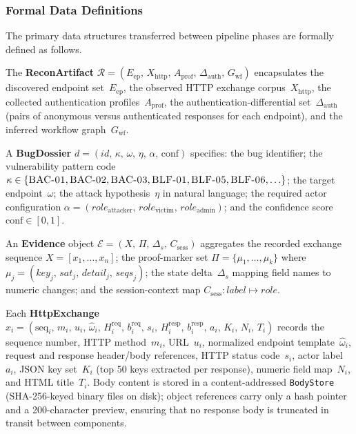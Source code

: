 \subsubsection{Formal Data Definitions}

The primary data structures transferred between pipeline phases are
formally defined as follows.

The \textbf{ReconArtifact}
$\mathcal{R} = (E_{\mathrm{ep}},\, X_{\mathrm{http}},\, A_{\mathrm{prof}},\,
\Delta_{\mathrm{auth}},\, G_{\mathrm{wf}})$
encapsulates the discovered endpoint set~$E_{\mathrm{ep}}$, the observed
HTTP exchange corpus~$X_{\mathrm{http}}$, the collected authentication
profiles~$A_{\mathrm{prof}}$, the authentication-differential
set~$\Delta_{\mathrm{auth}}$ (pairs of anonymous versus authenticated
responses for each endpoint), and the inferred workflow
graph~$G_{\mathrm{wf}}$.

A \textbf{BugDossier}
$d = (\mathit{id},\, \kappa,\, \omega,\, \eta,\, \alpha,\, \mathrm{conf})$
specifies: the bug identifier; the vulnerability pattern code
$\kappa \in \{\textsc{BAC-01}, \textsc{BAC-02}, \textsc{BAC-03},
\textsc{BLF-01}, \textsc{BLF-05}, \textsc{BLF-06}, \ldots\}$;
the target endpoint~$\omega$; the attack hypothesis~$\eta$ in natural
language; the required actor configuration
$\alpha = (\mathit{role}_{\mathrm{attacker}},\,
\mathit{role}_{\mathrm{victim}},\,
\mathit{role}_{\mathrm{admin}})$;
and the confidence score $\mathrm{conf} \in [0,1]$.

An \textbf{Evidence} object
$\mathcal{E} = (X,\, \Pi,\, \Delta_s,\, C_{\mathrm{sess}})$
aggregates the recorded exchange sequence $X = [x_1, \ldots, x_n]$; the
proof-marker set $\Pi = \{\mu_1, \ldots, \mu_k\}$ where
$\mu_j = (\mathit{key}_j,\, \mathit{sat}_j,\, \mathit{detail}_j,\,
\mathit{seqs}_j)$;
the state delta~$\Delta_s$ mapping field names to numeric changes; and the
session-context map $C_{\mathrm{sess}}: \mathit{label} \mapsto \mathit{role}$.

Each \textbf{HttpExchange}
$x_i = (\mathrm{seq}_i,\, m_i,\, u_i,\, \hat{\omega}_i,\,
H_i^{\mathrm{req}},\, b_i^{\mathrm{req}},\, s_i,\,
H_i^{\mathrm{resp}},\, b_i^{\mathrm{resp}},\,
a_i,\, K_i,\, N_i,\, T_i)$
records the sequence number, HTTP method~$m_i$, URL~$u_i$, normalized
endpoint template~$\hat{\omega}_i$, request and response header/body
references, HTTP status code~$s_i$, actor label~$a_i$, JSON key set~$K_i$
(top 50 keys extracted per response), numeric field map~$N_i$, and HTML
title~$T_i$.
Body content is stored in a content-addressed \texttt{BodyStore}
(SHA-256-keyed binary files on disk); object references carry only a
hash pointer and a 200-character preview, ensuring that no response body
is truncated in transit between components.

